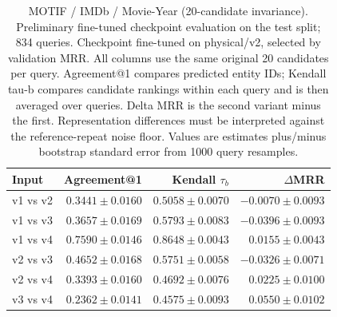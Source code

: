 \begin{table}[t]
\centering
\small
\begin{tabular}{lrrr}
\toprule
Input & Agreement@1 & Kendall $\tau_b$ & $\Delta$MRR \\
\midrule
v1 vs v2 & $0.3441 \pm 0.0160$ & $0.5058 \pm 0.0070$ & $-0.0070 \pm 0.0093$ \\
v1 vs v3 & $0.3657 \pm 0.0169$ & $0.5793 \pm 0.0083$ & $-0.0396 \pm 0.0093$ \\
v1 vs v4 & $0.7590 \pm 0.0146$ & $0.8648 \pm 0.0043$ & $0.0155 \pm 0.0043$ \\
v2 vs v3 & $0.4652 \pm 0.0168$ & $0.5751 \pm 0.0058$ & $-0.0326 \pm 0.0071$ \\
v2 vs v4 & $0.3393 \pm 0.0160$ & $0.4692 \pm 0.0076$ & $0.0225 \pm 0.0100$ \\
v3 vs v4 & $0.2362 \pm 0.0141$ & $0.4575 \pm 0.0093$ & $0.0550 \pm 0.0102$ \\
\bottomrule
\end{tabular}
\caption{MOTIF / IMDb / Movie-Year (20-candidate invariance). Preliminary fine-tuned checkpoint evaluation on the test split; 834 queries. Checkpoint fine-tuned on physical/v2, selected by validation MRR. All columns use the same original 20 candidates per query. Agreement@1 compares predicted entity IDs; Kendall tau-b compares candidate rankings within each query and is then averaged over queries. Delta MRR is the second variant minus the first. Representation differences must be interpreted against the reference-repeat noise floor. Values are estimates plus/minus bootstrap standard error from 1000 query resamples.}
\label{tab:motif-movie_year-invariance}
\end{table}
